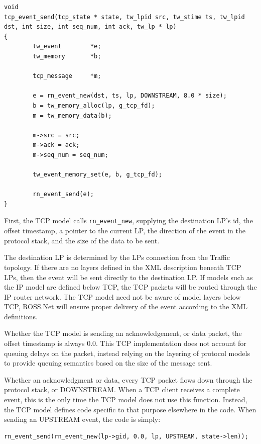 \documentclass[conference,onecolumn]{IEEEtran}
\begin{document}
\begin{small}\begin{verbatim}
void
tcp_event_send(tcp_state * state, tw_lpid src, tw_stime ts, tw_lpid dst, int size, int seq_num, int ack, tw_lp * lp)
{
        tw_event        *e;
        tw_memory       *b;

        tcp_message     *m;

        e = rn_event_new(dst, ts, lp, DOWNSTREAM, 8.0 * size);
        b = tw_memory_alloc(lp, g_tcp_fd);
        m = tw_memory_data(b);

        m->src = src;
        m->ack = ack;
        m->seq_num = seq_num;

        tw_event_memory_set(e, b, g_tcp_fd);

        rn_event_send(e);
}
\end{verbatim}\end{small}

First, the TCP model calls {\tt rn\_event\_new}, supplying the destination LP's id, the offset timestamp, a pointer to the current LP, the direction of the event in the protocol stack, and the size of the data to be sent.

The destination LP is determined by the LPs connection from the Traffic topology.  If there are no layers defined in the XML description beneath TCP LPs, then the event will be sent directly to the destination LP.  If models such as the IP model are defined below TCP, the TCP packets will be routed through the IP router network.  The TCP model need not be aware of model layers below TCP, ROSS.Net will ensure proper delivery of the event according to the XML definitions.

Whether the TCP model is sending an acknowledgement, or data packet, the offset timestamp is always 0.0.  This TCP implementation does not account for queuing delays on the packet, instead relying on the layering of protocol models to provide queuing semantics based on the size of the message sent.

Whether an acknowledgment or data, every TCP packet flows down through the protocol stack, or DOWNSTREAM.  When a TCP client receives a complete event, this is the only time the TCP model does not use this function.  Instead, the TCP model defines code specific to that purpose elsewhere in the code.  When sending an UPSTREAM event, the code is simply:

\begin{small}\begin{verbatim}
rn_event_send(rn_event_new(lp->gid, 0.0, lp, UPSTREAM, state->len));
\end{verbatim}\end{small}
\end{document}
